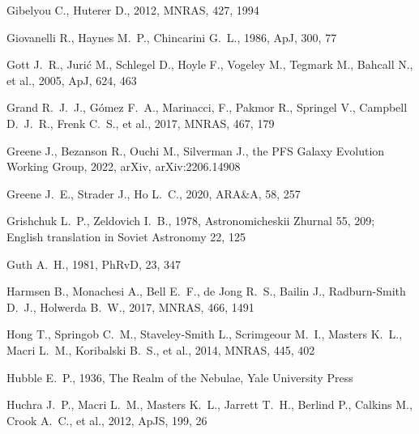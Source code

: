 \documentclass[fleqn,12pt]{article}
\begin{document}
\begin{thebibliography}{}
 Gibelyou C., Huterer D., 2012, MNRAS, 427, 1994

 Giovanelli R., Haynes M.~P., Chincarini G.~L., 1986, ApJ, 300, 77

 Gott J.~R., Juri{\'c} M., Schlegel D., Hoyle F., Vogeley M., Tegmark M., Bahcall N., et al., 2005, ApJ, 624, 463

 Grand R.~J.~J., G{\'o}mez F.~A., Marinacci, F., Pakmor R., Springel V., Campbell D.~J.~R., Frenk C.~S., et al., 2017, MNRAS, 467, 179

 Greene J., Bezanson R., Ouchi M., Silverman J., the PFS Galaxy Evolution Working Group, 2022, arXiv, arXiv:2206.14908

 Greene J.~E., Strader J., Ho L.~C., 2020, ARA\&A, 58, 257

 Grishchuk L.~P., Zeldovich I.~B., 1978, Astronomicheskii Zhurnal 55, 209; English translation in Soviet Astronomy 22, 125

 Guth A.~H., 1981, PhRvD, 23, 347

 Harmsen B., Monachesi A., Bell E.~F., de Jong R.~S., Bailin J., Radburn-Smith D.~J., Holwerda B.~W., 2017, MNRAS, 466, 1491

 Hong T., Springob C.~M., Staveley-Smith L., Scrimgeour M.~I., Masters K.~L., Macri L.~M., Koribalski B.~S., et al., 2014, MNRAS, 445, 402


 Hubble E.~P., 1936, The Realm of the Nebulae, Yale University Press

 Huchra J.~P., Macri L.~M., Masters K.~L., Jarrett T.~H., Berlind P., Calkins M., Crook A.~C., et al., 2012, ApJS, 199, 26


\end{thebibliography}
\end{document}
